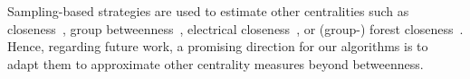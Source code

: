 Sampling-based strategies are used to estimate other centralities such as
closeness~\cite{DBLP:journals/ijbc/BrandesP07,DBLP:journals/jgaa/EppsteinW04},
group betweenness~\cite{DBLP:conf/ipps/MadduriEJBC09}, electrical
closeness~\cite{DBLP:conf/esa/AngrimanPGM20}, or (group-) forest
closeness~\cite{DBLP:conf/sdm/GrintenAPM21}. Hence, regarding future work, a
promising direction for our algorithms is to adapt them to approximate other
centrality measures beyond betweenness.
